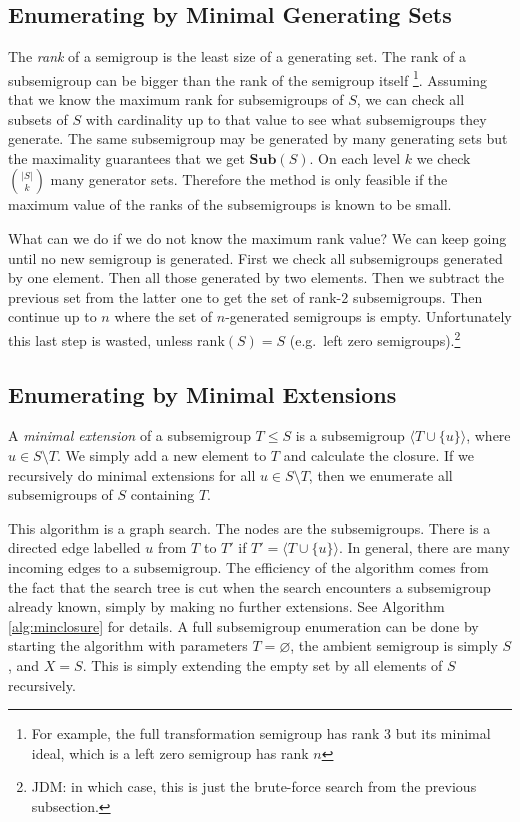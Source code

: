 \documentclass{amsart}
\newcommand{\Sub}{\mathbf{Sub}}
\theoremstyle{plain}
\theoremstyle{definition}
\begin{document}
\subsection{Enumerating by Minimal Generating Sets}
\label{sec:mingen}
The \emph{rank} of a semigroup is the least size of a  generating set.
The rank of a subsemigroup can be bigger than the rank of the semigroup itself
\footnote{For example, the full transformation semigroup has rank 3 \cite{} but
its minimal ideal, which is a left zero semigroup has rank $n$}. 
Assuming that we know the maximum rank for subsemigroups of $S$, we can check all subsets of $S$ with cardinality up to that value to see what subsemigroups they generate.
The same subsemigroup may be generated by many generating sets but the maximality guarantees that we get $\Sub(S)$.
On each level $k$ we check $\binom{|S|}{k}$ many generator sets.
Therefore the method is only feasible if the maximum value of the ranks of the subsemigroups is known to be small. 

What can we do if we do not know the maximum rank value?
We can keep going until no new semigroup is generated.
First we check all subsemigroups generated by one element.
Then all those generated by two elements.
Then we subtract the previous set from the latter one to get the set of rank-2 subsemigroups.
Then continue up to $n$ where the set of $n$-generated semigroups is empty.
Unfortunately this last step is wasted, unless rank$(S)=S$ (e.g.~left zero
semigroups).\footnote{JDM: in which case, this is just the brute-force search
from the previous subsection.}


\subsection{Enumerating by Minimal Extensions}
\label{sec:minext}

A \emph{minimal extension} of a subsemigroup $T\leq S$ is a subsemigroup $\langle T\cup\{u\}\rangle$, where $u\in S\setminus T$.
We simply add a new element to $T$ and calculate the closure.
If we recursively do minimal extensions for all $u\in S\setminus T$, then we enumerate all subsemigroups of $S$ containing $T$.

This algorithm is a graph search.
The nodes are the subsemigroups.
There is a directed edge labelled $u$ from $T$ to $T'$ if $T'=\langle T\cup\{u\}\rangle$.
In general, there are many incoming edges to a subsemigroup.
The efficiency of the algorithm  comes from the fact that the search tree is cut when the search encounters a subsemigroup already known, simply by making no further extensions.
See Algorithm \ref{alg:minclosure} for details.
A full subsemigroup enumeration can be done by starting the algorithm with parameters $T=\varnothing$, the ambient semigroup is simply $S$, and  $X=S$.
This is simply extending the empty set by all elements of $S$ recursively.
\end{document}
